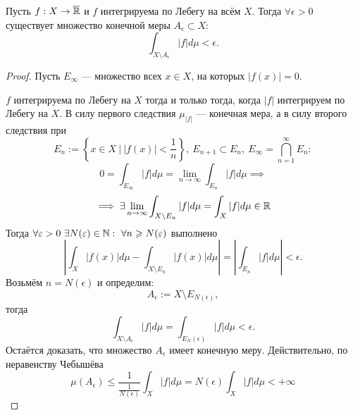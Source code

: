 \begin{theorem}
    Пусть $f: X \to \overline{\mathbb{R}}$ и $f$ интегрируема по Лебегу на всём $X$.
    Тогда $\forall \epsilon > 0$ существует множество конечной меры $A_\epsilon \subset X:$
    \[\int_{X \setminus A_\epsilon} |f| d\mu < \epsilon.\]
\end{theorem} 
\begin{proof}
    Пусть $E_\infty$ — множество всех $x \in X$, на которых $|f(x)| = 0$.

    $f$ интегрируема по Лебегу на $X$ тогда и только тогда, когда $|f|$ интегрируем по Лебегу на $X$.
    В силу первого следствия $\mu_{|f|}$ — конечная мера, а в силу второго следствия при
    \[E_n := \left\{x \in X \ | \ |f(x)| < \frac{1}{n}\right\}, \ E_{n+1} \subset E_n, \ E_\infty = \bigcap\limits_{n=1}^{\infty}E_n:\]
    \[0 = \int_{E_\infty} |f| d\mu = \lim\limits_{n \to \infty} \int_{E_n} |f|d\mu \implies\]
    \[\implies \exists \lim\limits_{n \to \infty} \int_{X \setminus E_n} |f| d\mu = \int_X |f| d\mu \in \mathbb{R}\]
    Тогда $\forall \varepsilon > 0 \ \exists N(\varepsilon) \in \mathbb{N}: \ \forall n \geqslant N(\varepsilon)$ выполнено
    \[\left|\int_X |f(x)| d\mu - \int_{X \setminus E_n} |f(x)| d\mu\right| = \left|\int_{E_n} |f|d\mu\right| < \epsilon.\]
    Возьмём $n = N(\epsilon)$ и определим:
    \[A_\epsilon := X \setminus E_{N(\epsilon)},\]
    тогда
    \[\int_{X \setminus A_\epsilon} |f|d\mu = \int_{E_N(\epsilon)} |f| d\mu < \epsilon.\]
    Остаётся доказать, что множество $A_\epsilon$ имеет конечную меру.
    Действительно, по неравенству Чебышёва
    \[\mu(A_\epsilon) 
    \leqslant
    \frac{1}{\frac{1}{N(\epsilon)}} \int_X |f| d\mu 
    =
    N(\epsilon) \int_X |f| d\mu < +\infty
    \]
\end{proof} 

